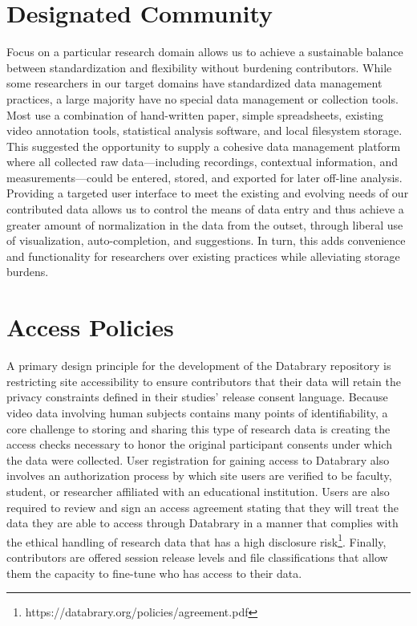 \documentclass{sig-alternate}
\begin{document}
\section{Designated Community}

Focus on a particular research domain allows us to achieve a sustainable balance between standardization and flexibility without burdening contributors.
While some researchers in our target domains have standardized data management practices, a large majority have no special data management or collection tools.
Most use a combination of hand-written paper, simple spreadsheets, existing video annotation tools, statistical analysis software, and local filesystem storage.
This suggested the opportunity to supply a cohesive data management platform where all collected raw data---including recordings, contextual information, and measurements---could be entered, stored, and exported for later off-line analysis.
Providing a targeted user interface to meet the existing and evolving needs of our contributed data allows us to control the means of data entry and thus achieve a greater amount of normalization in the data from the outset, through liberal use of visualization, auto-completion, and suggestions.
In turn, this adds convenience and functionality for researchers over existing practices while alleviating storage burdens.

\section{Access Policies}

A primary design principle for the development of the Databrary repository is restricting site accessibility to ensure contributors that their data will retain the privacy constraints defined in their studies' release consent language. 
Because video data involving human subjects contains many points of identifiability, a core challenge to storing and sharing this type of research data is creating the access checks necessary to honor the original participant consents under which the data were collected. 
User registration for gaining access to Databrary also involves an authorization process by which site users are verified to be faculty, student, or researcher affiliated with an educational institution.
Users are also required to review and sign an access agreement stating that they will treat the data they are able to access through Databrary in a manner that complies with the ethical handling of research data that has a high disclosure risk\footnote{https://databrary.org/policies/agreement.pdf}.
Finally, contributors are offered session release levels and file classifications that allow them the capacity to fine-tune who has access to their data. 
\end{document}

